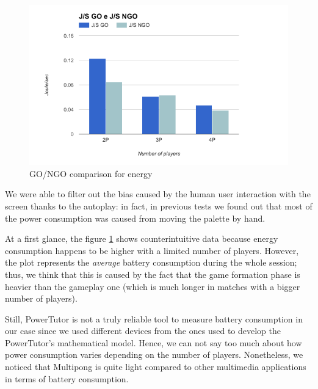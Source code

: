 \begin{figure}[H]
	\includegraphics[width=\columnwidth]{img/energy.png}
	
	\caption{GO/NGO comparison for energy}\label{fig:energy}
\end{figure}


We were able to filter out the bias caused by the human user interaction with
the screen thanks to the autoplay: in fact, in previous tests we found out
that most of the power consumption was caused from moving the palette by hand.

At a first glance, the figure \ref{fig:energy} shows counterintuitive data
because energy consumption happens to be higher with a limited number of
players. However, the plot represents the \textit{average} battery consumption
during the whole session; thus, we think that this is caused by the fact that
the game formation phase is heavier than the gameplay one (which is much longer
in matches with a bigger number of players).

Still, PowerTutor is not a truly reliable tool to measure battery consumption in
our case since we used different devices from the ones used to develop the
PowerTutor's mathematical model. Hence, we can not say too much about how power
consumption varies depending on the number of players. Nonetheless, we noticed
that Multipong is quite light compared to other multimedia applications in
terms of battery consumption.

